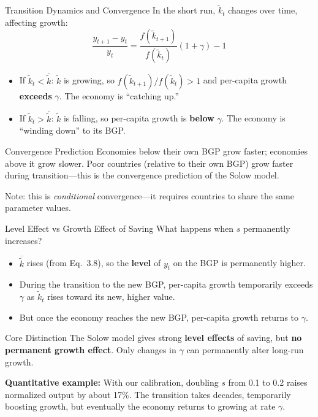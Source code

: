 \documentclass[aspectratio=169,10pt]{beamer}
\begin{document}
\begin{frame}{Transition Dynamics and Convergence}
In the short run, $\tilde{k}_t$ changes over time, affecting growth:
\[
\frac{y_{t+1}-y_t}{y_t} = \frac{f(\tilde{k}_{t+1})}{f(\tilde{k}_t)}(1+\gamma) - 1
\]
\begin{itemize}
  \item If $\tilde{k}_t < \overline{\tilde{k}}$: $\tilde{k}$ is growing, so $f(\tilde{k}_{t+1})/f(\tilde{k}_t) > 1$ and per-capita growth \textbf{exceeds} $\gamma$. The economy is ``catching up.''
  \item If $\tilde{k}_t > \overline{\tilde{k}}$: $\tilde{k}$ is falling, so per-capita growth is \textbf{below} $\gamma$. The economy is ``winding down'' to its BGP.
\end{itemize}
\begin{block}{Convergence Prediction}
Economies below their own BGP grow faster; economies above it grow slower. Poor countries (relative to their own BGP) grow faster during transition---this is the convergence prediction of the Solow model.
\end{block}
Note: this is \emph{conditional} convergence---it requires countries to share the same parameter values.
\end{frame}

\begin{frame}{Level Effect vs Growth Effect of Saving}
What happens when $s$ permanently increases?
\begin{itemize}
  \item $\overline{\tilde{k}}$ rises (from Eq.\ 3.8), so the \textbf{level} of $y_t$ on the BGP is permanently higher.
  \item During the transition to the new BGP, per-capita growth temporarily exceeds $\gamma$ as $\tilde{k}_t$ rises toward its new, higher value.
  \item But once the economy reaches the new BGP, per-capita growth returns to $\gamma$.
\end{itemize}
\begin{block}{Core Distinction}
The Solow model gives strong \textbf{level effects} of saving, but \textbf{no permanent growth effect}. Only changes in $\gamma$ can permanently alter long-run growth.
\end{block}
\textbf{Quantitative example:} With our calibration, doubling $s$ from 0.1 to 0.2 raises normalized output by about 17\%. The transition takes decades, temporarily boosting growth, but eventually the economy returns to growing at rate $\gamma$.
\end{frame}
\end{document}
